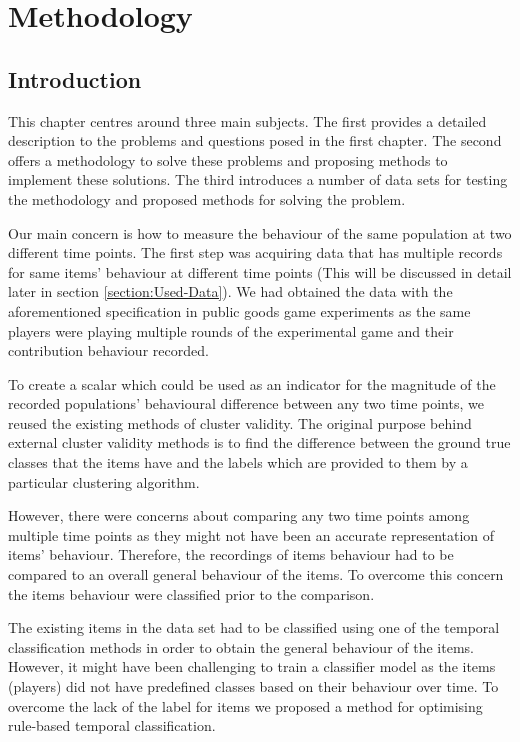 \chapter{Methodology}
\label{Chap:Methodology}


\section{Introduction}
This chapter centres around three main subjects. The first provides a detailed description to the problems and questions posed in the first chapter. The second offers a methodology to solve these problems and proposing methods to implement these solutions. The third introduces a number of data sets for testing the methodology and proposed methods for solving the problem.

Our main concern is how to measure the behaviour of the same population at two different time points. The first step was acquiring data that has multiple records for same items' behaviour at different time points (This will be discussed in detail later in section \ref{section:Used-Data}). We had obtained the data with the aforementioned specification in public goods game experiments as the same players were playing multiple rounds of the experimental game and their contribution behaviour recorded.

To create a scalar which could be used as an indicator for the magnitude of the recorded populations' behavioural difference between any two time points, we reused the existing methods of cluster validity. The original purpose behind external cluster validity methods is to find the difference between the ground true classes that the items have and the labels which are provided to them by a particular clustering algorithm. 

However, there were concerns about comparing any two time points among multiple time points as they might not have been an accurate representation of items' behaviour. Therefore, the recordings of items behaviour had to be compared to an overall general behaviour of the items. To overcome this concern the items behaviour were classified prior to the comparison.

The existing items in the data set had to be classified using one of the temporal classification methods in order to obtain the general behaviour of the items. However, it might have been challenging to train a classifier model as the items (players) did not have predefined classes based on their behaviour over time. To overcome the lack of the label for items we proposed a method for optimising rule-based temporal classification. 

